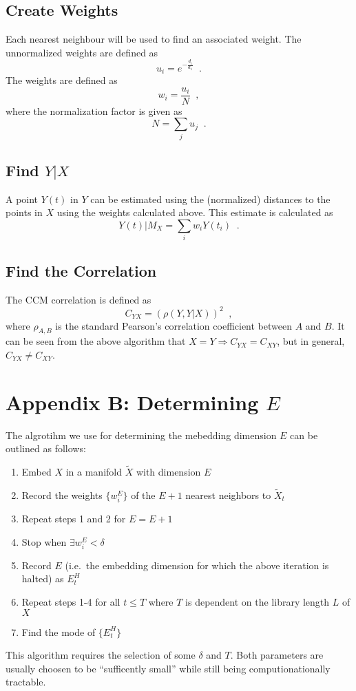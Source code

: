 \documentclass[a4paper,11pt]{article}
\begin{document}
\subsection{Create Weights}
Each nearest neighbour will be used to find an associated weight.  The unnormalized weights are defined as
$$
u_i = e^{-\frac{d_i}{d_1}}\;\;.
$$
The weights are defined as
$$
w_i = \frac{u_i}{N}\;\;,
$$
where the normalization factor is given as
$$
N = \sum_j u_j\;\;.
$$

\subsection{Find $Y|X$}
A point $Y(t)$ in $Y$ can be estimated using the (normalized) distances to the points in $X$ using the weights calculated above.  This estimate is calculated as
$$
Y(t)|M_X = \sum_i w_i Y(t_i)\;\;.
$$

\subsection{Find the Correlation}
The CCM correlation is defined as 
$$
C_{YX} = \left(\rho\left(Y,Y|X\right)\right)^2\;\;,
$$
where $\rho_{A,B}$ is the standard Pearson's correlation coefficient between $A$ and $B$.  It can be seen from the above algorithm that $X=Y \Rightarrow C_{YX}=C_{XY}$, but in general, $C_{YX}\neq C_{XY}$.  

\section{Appendix B: Determining $E$}
\label{sec:appB}
The algrotihm we use for determining the mebedding dimension $E$ can be outlined as follows:
\begin{enumerate}
\item Embed $X$ in a manifold $\tilde{X}$ with dimension $E$
\item Record the weights $\{w^E_i\}$ of the $E+1$ nearest neighbors to $\tilde{X}_t$ 
\item Repeat steps 1 and 2 for $E=E+1$
\item Stop when $\exists w^E_i < \delta$
\item Record $E$ (i.e.\ the embedding dimension for which the above iteration is halted) as $E^H_t$
\item Repeat steps 1-4 for all $t\le T$ where $T$ is dependent on the library length $L$ of $X$ 
\item Find the mode of $\{E_t^H\}$
\end{enumerate}
This algorithm requires the selection of some $\delta$ and $T$.  Both parameters are usually choosen to be ``sufficently small'' while still being computionationally tractable.  
\end{document}

